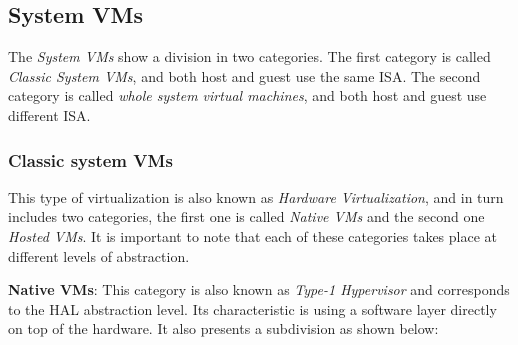 	\subsection{System VMs}
	
	The \textit{System VMs} show a division in two categories.  The first category is called \textit{Classic System VMs}, and both host and guest use the same ISA. The second category is called \textit{whole system virtual machines}, and both host and guest use different ISA.
	
	\subsubsection{Classic system VMs} This type of virtualization is also known as \textit{Hardware Virtualization}, and in turn includes two categories, the first one is called \textit{Native VMs} and the second one \textit{Hosted VMs}. It is important to note that each of these categories takes place at different levels of abstraction.
	
	\textbf{Native VMs}: This category is also known as \textit{Type-1 Hypervisor} and corresponds to the HAL abstraction level. Its characteristic is using a software layer directly on top of the hardware. It also presents a subdivision as shown below:
		
